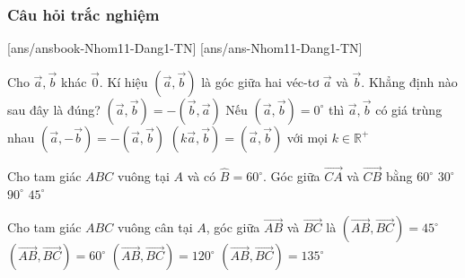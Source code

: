 \subsubsection{Câu hỏi trắc nghiệm}
[ans/ansbook-Nhom11-Dang1-TN]
[ans/ans-Nhom11-Dang1-TN]
\begin{ex}
	Cho $\overrightarrow{a},\overrightarrow{b}$ khác $\overrightarrow{0}$. Kí hiệu $\left (\overrightarrow{a},\overrightarrow{b}\right )$ là góc giữa hai véc-tơ $\overrightarrow{a}$ và $\overrightarrow{b}$. Khẳng định nào sau đây là đúng?
	\choice
	{$\left (\overrightarrow{a},\overrightarrow{b}\right )=-\left (\overrightarrow{b},\overrightarrow{a}\right )$}
	{Nếu $\left (\overrightarrow{a},\overrightarrow{b}\right )=0^\circ$ thì $\overrightarrow{a},\overrightarrow{b}$ có giá trùng nhau}
	{$\left (\overrightarrow{a},-\overrightarrow{b}\right )=-\left (\overrightarrow{a},\overrightarrow{b}\right )$}
	{\True $\left (k\overrightarrow{a},\overrightarrow{b}\right )=\left (\overrightarrow{a},\overrightarrow{b}\right )$ với mọi $k\in\mathbb{R}^+$}
\end{ex}
\begin{ex}
	Cho tam giác $ABC$ vuông tại $A$ và có $\widehat{B}=60^\circ$. Góc giữa $\overrightarrow{CA}$ và $\overrightarrow{CB}$ bằng
	\choice
	{$60^\circ$}
	{\True $30^\circ$}
	{$90^\circ$}
	{$45^\circ$}
\end{ex}
\begin{ex}%
	Cho tam giác $ABC$ vuông cân tại $A$, góc giữa $\overrightarrow{AB}$ và $\overrightarrow{BC}$ là
	\choice
	{$\left( \overrightarrow{AB}, \overrightarrow{BC}\right)=45^{\circ} $}
	{$\left( \overrightarrow{AB}, \overrightarrow{BC}\right)=60^{\circ} $}
	{$\left( \overrightarrow{AB}, \overrightarrow{BC}\right)=120^{\circ} $}
	{\True $\left( \overrightarrow{AB}, \overrightarrow{BC}\right)=135^{\circ} $}
\end{ex}

